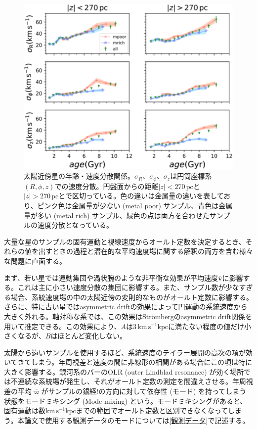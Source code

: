 \begin{figure}[htbp]
\begin{center}
	\includegraphics[width=12cm]{fig/YuLiu18_VD.pdf}
	\caption{太陽近傍星の年齢・速度分散関係\cite{YL18}。$\sigma_R、\sigma_{\phi}、\sigma_z$は円筒座標系$(R,\phi,z)$での速度分散。円盤面からの距離$|z|<270\,\mathrm{pc}$と$|z|>270\,\mathrm{pc}$とで区切っている。色の違いは金属量の違いを表しており、ピンク色は金属量が少ない (metal poor) サンプル、青色は金属量が多い (metal rich) サンプル、緑色の点は両方を合わせたサンプルの速度分散となっている。}
	\label{VDbyYL18}
\end{center}
\end{figure}


大量な星のサンプルの固有運動と視線速度からオールト定数を決定するとき、それらの値を出すときの過程と潜在的な平均速度場に関する解釈の両方を含む様々な問題に直面する。

まず、若い星では運動集団や渦状腕のような非平衡な効果が平均速度$\overline{\pmb{v}}$に影響する。これは主に小さい速度分散の集団に影響する。また、サンプル数が少なすぎる場合、系統速度場の中の太陽近傍の変則的なものがオールト定数に影響する。さらに、特に古い星ではasymmetric driftの効果によって円運動の系統速度から大きく外れる。軸対称な系では、この効果はStr\"{o}mbergのasymmetric drift関係を用いて推定できる。この効果により、$A$は$3\,\mathrm{km\,s^{-1}kpc}$に満たない程度の値だけ小さくなるが、$B$はほとんど変化しない。

太陽から遠いサンプルを使用するほど、系統速度のテイラー展開の高次の項が効いてきてしまう。年周視差と速度の間に非線形の相関がある場合にこの項は特に大きく影響する。銀河系のバーのOLR (outer Lindblad resonance) が効く場所では不連続な系統場が発生し、それがオールト定数の測定を間違えさせる。年周視差の平均$\overline{\varpi}$がサンプルの銀経$l$の方向に対して依存性 (モード) を持ってしまう状態をモードミキシング (Mode mixing) という。モードミキシングがあると、固有運動は数$\mathrm{km\,s^{-1}kpc}$までの範囲でオールト定数と区別できなくなってしまう。本論文で使用する観測データのモードについては\ref{観測データ}で記述する。

